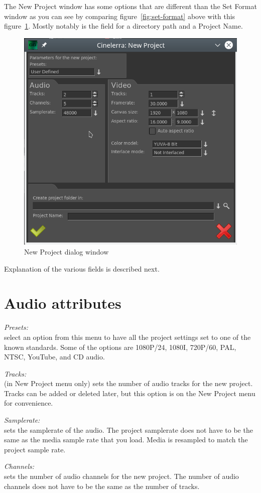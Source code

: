 The New Project window has some options that are different than the Set Format window as you can see by comparing figure~\ref{fig:set-format} above with this figure~\ref{fig:new-project}. Mostly notably is the field for a directory path and a Project Name.

\begin{figure}[htpb]
	\centering
	\includegraphics[width=0.5\linewidth]{images/new-project.png}
	\caption{New Project dialog window}
	\label{fig:new-project}
\end{figure}

Explanation of the various fields is described next.

\section{Audio attributes}%
\label{sec:audio_attributes}

\textit{Presets:}\\
select an option from this menu to have all the project settings set to one of the known standards.  Some of the options are 1080P/24, 1080I, 720P/60, PAL, NTSC, YouTube, and CD audio.

\textit{Tracks:}\\
(in New Project menu only) sets the number of audio tracks for the new project. Tracks can be added or deleted later, but this option is on the New Project menu for convenience.

\textit{Samplerate:}\\
sets the samplerate of the audio. The project samplerate does not have to be the same as the media sample rate that you load. Media is resampled to match the project sample rate.

\textit{Channels:}\\
sets the number of audio channels for the new project. The number of audio channels does not have to be the same as the number of tracks.

